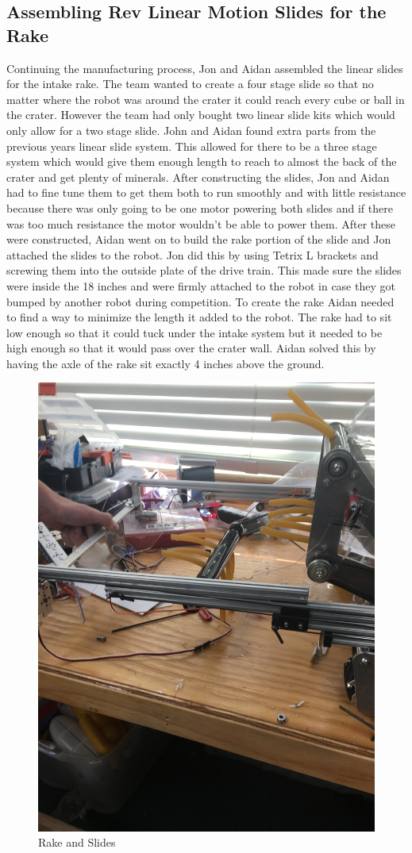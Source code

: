 \documentclass{article}
\newif\ifcontents
\begin{document}
\contentsfalse

\subsection{Assembling Rev Linear Motion Slides for the Rake}
Continuing the manufacturing process, Jon and Aidan assembled the linear slides for the intake rake. The team wanted to create a four stage slide so that no matter where the robot was around the crater it could reach every cube or ball in the crater. However the team had only bought two linear slide kits which would only allow for a two stage slide. John and Aidan found extra parts from the previous years linear slide system. This allowed for there to be a three stage system which would give them enough length to reach to almost the back of the crater and get plenty of minerals. After constructing the slides, Jon and Aidan had to fine tune them to get them both to run smoothly and with little resistance because there was only going to be one motor powering both slides and if there was too much resistance the motor wouldn't be able to power them. After these were constructed, Aidan went on to build the rake portion of the slide and Jon attached the slides to the robot. Jon did this by using Tetrix L brackets and screwing them into the outside plate of the drive train. This made sure the slides were inside the 18 inches and were firmly attached to the robot in case they got bumped by another robot during competition. To create the rake Aidan needed to find a way to minimize the length it added to the robot. The rake had to sit low enough so that it could tuck under the intake system but it needed to be high enough so that it would pass over the crater wall. Aidan solved this by having the axle of the rake sit exactly 4 inches above the ground.

\begin{figure}
    \centering
    \includegraphics[width=.6 \textwidth, angle=-90 ]{11_11-12/images/rake_slides.JPG}
    \caption{Rake and Slides}
    \label{fig:Intake CAD}
\end{figure}
\end{document}
